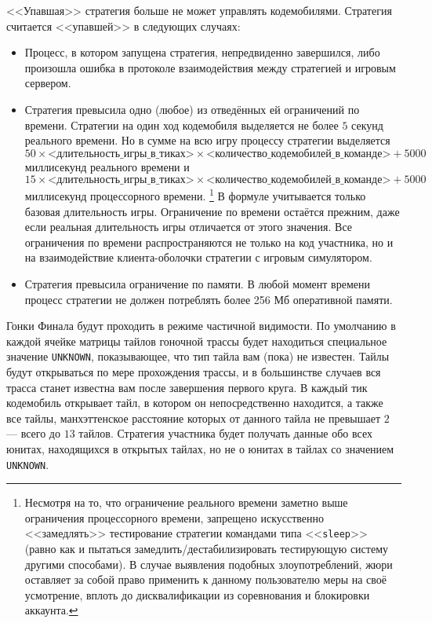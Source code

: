 <<Упавшая>> стратегия больше не может управлять кодемобилями. Стратегия считается <<упавшей>> в следующих случаях:
\begin{itemize}
  \item Процесс, в котором запущена стратегия, непредвиденно завершился, либо произошла ошибка в протоколе взаимодействия между стратегией
        и игровым сервером.
  \item Стратегия превысила одно (любое) из отведённых ей ограничений по времени. Стратегии на один ход кодемобиля выделяется не более
        $5$ секунд реального времени. Но в сумме на всю игру процессу стратегии выделяется
        \begin{equation}
        50\times\textit{<длительность\_игры\_в\_тиках>}\times\textit{<количество\_кодемобилей\_в\_команде>}+5000
        \end{equation}
        миллисекунд реального времени и
        \begin{equation}
        15\times\textit{<длительность\_игры\_в\_тиках>}\times\textit{<количество\_кодемобилей\_в\_команде>}+5000
        \end{equation}
        миллисекунд процессорного времени. \footnote[1]{Несмотря на то, что ограничение реального времени заметно выше ограничения
        процессорного времени, запрещено искусственно <<замедлять>> тестирование стратегии командами типа <<\texttt{sleep}>> (равно как и
        пытаться замедлить/дестабилизировать тестирующую систему другими способами). В случае выявления подобных злоупотреблений, жюри
        оставляет за собой право применить к данному пользователю меры на своё усмотрение, вплоть до дисквалификации из соревнования и
        блокировки аккаунта.} В формуле учитывается только базовая длительность игры. Ограничение по времени остаётся прежним, даже если
        реальная длительность игры отличается от этого значения. Все ограничения по времени распространяются не только на код участника, но
        и на взаимодействие клиента-оболочки стратегии с игровым симулятором.
  \item Стратегия превысила ограничение по памяти. В любой момент времени процесс стратегии не должен потреблять более 256 Мб оперативной
        памяти.
\end{itemize}

Гонки Финала будут проходить в режиме частичной видимости. По умолчанию в каждой ячейке матрицы тайлов гоночной трассы будет находиться
специальное значение \texttt{UNKNOWN}, показывающее, что тип тайла вам (пока) не известен. Тайлы будут открываться по мере прохождения
трассы, и в большинстве случаев вся трасса станет известна вам после завершения первого круга. В каждый тик кодемобиль открывает тайл, в
котором он непосредственно находится, а также все тайлы, манхэттенское расстояние которых от данного тайла не превышает $2$ --- всего до
$13$ тайлов. Стратегия участника будет получать данные обо всех юнитах, находящихся в открытых тайлах, но не о юнитах в тайлах со значением
\texttt{UNKNOWN}.

